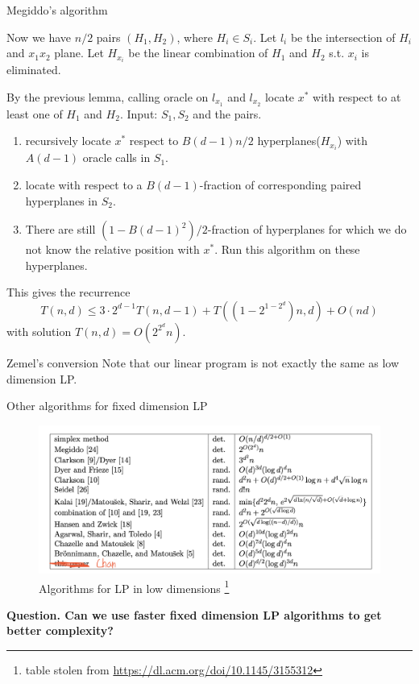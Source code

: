 \documentclass{beamer}
\begin{document}
\begin{frame}[allowframebreaks]{Megiddo's algorithm}
\begin{minipage}[t]{.5\textwidth}
\begin{figure}
    \end{figure}
    \end{minipage}%
    \begin{minipage}[t]{.5\textwidth} 
        \vspace{25pt}
        Now we have $n/2$ pairs $(H_1,H_2)$, where $H_i\in S_i$. Let $l_i$ be the intersection of $H_i$ and $x_1x_2$ plane.
        Let $H_{x_i}$ be the linear combination of $H_1$ and $H_2$ s.t. $x_i$ is eliminated.
    \end{minipage}

    { 
    By the previous lemma, calling oracle on $l_{x_1}$ and $l_{x_2}$ locate $x^*$ with respect to at least one of $H_1$ and $H_2$.}
    \newpage
    Input: $S_1,S_2$ and the pairs.
    \begin{enumerate}
        \item recursively locate $x^*$ respect to $B(d-1)n/2$ hyperplanes($H_{x_i}$) with $A(d-1)$ oracle calls in $S_1$.
        \item locate with respect to a $B(d-1)$-fraction of corresponding paired hyperplanes in $S_2$.
        \item There are still $(1-{B(d-1)}^2)/2$-fraction of hyperplanes for which we do not know the relative position with $x^*$. Run this algorithm on these hyperplanes.
    \end{enumerate}
    This gives the recurrence
    \[
        T(n,d)\leq 3\cdot 2^{d-1}T(n,d-1)+T((1-2^{1-2^d})n,d)+O(nd)
    \]
    with solution $T(n,d)=O(2^{2^d}n)$.
\end{frame}
\begin{frame}{Zemel's conversion}
    Note that our linear program is not exactly the same as low dimension LP.
\end{frame}

\begin{frame}{Other algorithms for fixed dimension LP}
    \begin{figure}
        \centering
        \includegraphics[width=\textwidth]{images/table.png}
        \caption{Algorithms for LP in low dimensions \footnote{table stolen from \url{https://dl.acm.org/doi/10.1145/3155312}}}
    \end{figure}
    \textbf{Question. Can we use faster fixed dimension LP algorithms to get better complexity?}
\end{frame}
\end{document}
